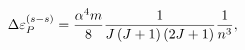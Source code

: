 \begin{equation}
\Delta \varepsilon _{P}^{\left( s-s\right) }=\frac{\alpha ^{4}m}{8}\frac{1}{%
J\left( J+1\right) \left( 2J+1\right) }\frac{1}{n^{3}},
\end{equation}

